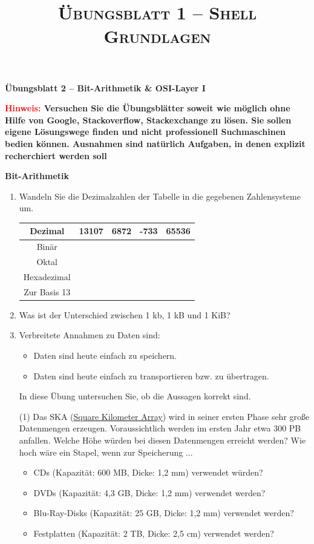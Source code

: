 \documentclass[paper=a4,fontsize=11pt]{scrartcl}%
\title{	
\normalfont \normalsize 
\textsc{Übungsblatt 1 -- Shell Grundlagen}
}
\numberwithin{equation}{section}
\begin{document}
\center
\Large{\textbf{Übungsblatt 2 -- Bit-Arithmetik \& OSI-Layer I}}\\
\large{\textbf{\textcolor{red}{Hinweis:} Versuchen Sie die Übungsblätter soweit wie möglich ohne Hilfe von Google, Stackoverflow, Stackexchange zu lösen. Sie sollen eigene Lösungswege finden und nicht professionell Suchmaschinen bedien können. Ausnahmen sind natürlich Aufgaben, in denen explizit recherchiert werden soll}
\begin{center}\Large{\textbf{Bit-Arithmetik}}\end{center}\vskip0.25in
\begin{enumerate}
\item Wandeln Sie die Dezimalzahlen der Tabelle in die gegebenen Zahlensysteme um.
\begin{table}[H]	
\begin{tabular}{|c|c|c|c|c|}
  \hline
 Dezimal & 13107 & 6872 & -733 & 65536 \\ \hline 
  Binär & & & &  \\ \hline
  Oktal & & & &  \\ \hline
  Hexadezimal & & & &  \\ \hline
  Zur Basis 13 & & & & \\ \hline
\end{tabular}
\end{table}
	\item Was ist der Unterschied zwischen 1 kb, 1 kB und 1 KiB?
	\item Verbreitete Annahmen zu Daten sind:
	\begin{itemize}
		\item Daten sind heute einfach zu speichern.
		\item Daten sind heute einfach zu transportieren bzw. zu übertragen.
	\end{itemize}
	In diese Übung untersuchen Sie, ob die Aussagen korrekt sind.
	\begin{tasks}(1)
		\task Das SKA (\href{https://skatelescope.org/}{Square Kilometer Array}) wird in seiner ersten Phase sehr große Datenmengen erzeugen. Voraussichtlich werden im ersten Jahr etwa 300 PB anfallen. Welche Höhe würden bei diesen Datenmengen erreicht werden? Wie hoch wäre ein Stapel, wenn zur Speicherung ...
		\begin{itemize}
		\item CDs (Kapazität: 600 MB, Dicke: 1,2 mm) verwendet würden?
		\item DVDs (Kapazität: 4,3 GB, Dicke: 1,2 mm) verwendet werden?
		\item Blu-Ray-Disks (Kapazität: 25 GB, Dicke: 1,2 mm) verwendet werden?
		\item Festplatten (Kapazität: 2 TB, Dicke: 2,5 cm) verwendet werden?
		\end{itemize}	 
	\end{tasks}
	

\end{enumerate}}
\end{document}
